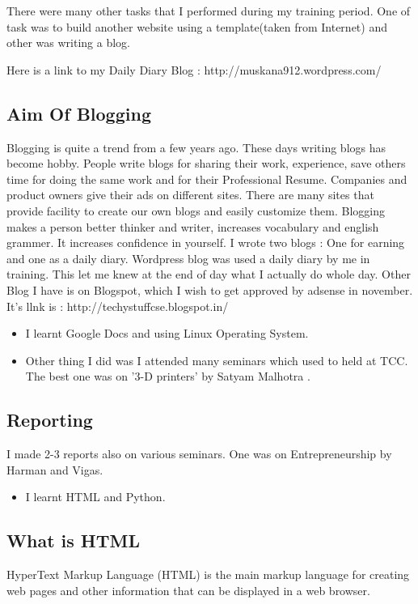 There were many other tasks that I performed during my training period. 
One of task was to build another website using a template(taken from Internet) and other was writing a blog.

Here is a link to my Daily Diary Blog :
http://muskana912.wordpress.com/





\subsection{Aim Of Blogging}
Blogging is quite a trend from a few years ago. These days writing blogs has become hobby.
People write blogs for sharing their work, experience, save others time for doing the same 
work and for their Professional Resume. Companies and product owners give their
ads on different sites. There are many sites that provide facility to 
create our own blogs and easily customize them.
Blogging makes a person better thinker and writer, increases vocabulary and english grammer. It increases confidence in yourself. I wrote two blogs : One for earning and one as a daily diary. 
Wordpress blog was used a daily diary by me in training. This let me knew at the end of day what I actually do whole day.
Other Blog I have is on Blogspot, which I wish to get approved by adsense in november.
It's llnk is :
http://techystuffcse.blogspot.in/
\begin{itemize}
\item I learnt Google Docs and using Linux Operating System.
\end{itemize}

\begin{itemize}
 
\item Other thing I did was I attended many seminars which used to held at TCC. The best one was on '3-D printers' by Satyam Malhotra .
\end{itemize}
\subsection{Reporting}
I made 2-3 reports also on various seminars. One was on Entrepreneurship by Harman and Vigas.
\begin{itemize}
 
\item I learnt HTML and Python.
\end{itemize}
\subsection{What is HTML}
HyperText Markup Language (HTML) is the main markup language for creating
 web pages and other information that can be displayed in a web browser.

